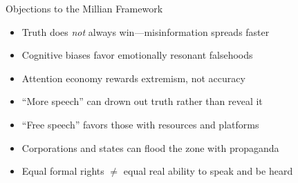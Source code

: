 ﻿\documentclass[aspectratio=169]{beamer}
\begin{document}
\begin{frame}{Objections to the Millian Framework}
\begin{objectionbox}
\begin{itemize}
    \item Truth does \textit{not} always win---misinformation spreads faster
    \item Cognitive biases favor emotionally resonant falsehoods
    \item Attention economy rewards extremism, not accuracy
    \item ``More speech'' can drown out truth rather than reveal it
\end{itemize}
\end{objectionbox}

\vspace{0.3cm}
\begin{objectionbox}
\begin{itemize}
    \item ``Free speech'' favors those with resources and platforms
    \item Corporations and states can flood the zone with propaganda
    \item Equal formal rights $\neq$ equal real ability to speak and be heard
\end{itemize}
\end{objectionbox}
\end{frame}
\end{document}
